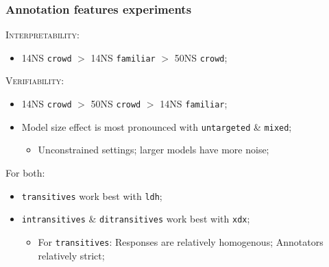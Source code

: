 \documentclass[handout,xcolor={dvipsnames}]{beamer}
\newcommand{\feat}[1]{\textsc{#1}}
\newcommand{\param}[1]{\texttt{#1}}
\begin{document}
\begin{frame}
\frametitle{Annotation features experiments}
\vspace{-.5em}
\feat{Interpretability}:
\begin{itemize}
\item 14NS \param{crowd} $>$ 14NS \param{familiar} $>$ 50NS \param{crowd};
\end{itemize}

\vspace{1em}

\feat{Verifiability}:
\begin{itemize}
\item 14NS \param{crowd} $>$ 50NS \param{crowd} $>$ 14NS \param{familiar};
\item Model size effect is most pronounced with \param{untargeted} \& \param{mixed};
\begin{itemize}
\item Unconstrained settings; larger models have more noise;
\end{itemize}
\end{itemize}

\vspace{1em}

For both:
\begin{itemize}
\item \param{transitives} work best with \param{ldh};
\item \param{intransitives} \& \param{ditransitives} work best with \param{xdx};
\begin{itemize}
\item For \param{transitives}: Responses are relatively homogenous; Annotators relatively strict;
\end{itemize}
\end{itemize}


\end{frame}
\end{document}
